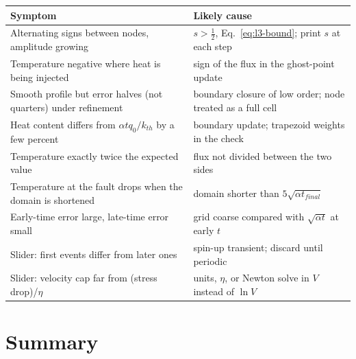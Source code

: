\begin{center}
\small
\renewcommand{\arraystretch}{1.15}
\begin{tabular}{p{}p{}}
\toprule
Symptom & Likely cause \\
\midrule
Alternating signs between nodes, amplitude growing & $s>\tfrac12$, Eq.~\eqref{eq:l3-bound}; print $s$ at each step \\
Temperature negative where heat is being injected & sign of the flux in the ghost-point update \\
Smooth profile but error halves (not quarters) under refinement & boundary closure of low order; node treated as a full cell \\
Heat content differs from $\alpha t q_0/k_{th}$ by a few percent & boundary update; trapezoid weights in the check \\
Temperature exactly twice the expected value & flux not divided between the two sides \\
Temperature at the fault drops when the domain is shortened & domain shorter than $5\sqrt{\alpha t_{final}}$ \\
Early-time error large, late-time error small & grid coarse compared with $\sqrt{\alpha t}$ at early $t$ \\
Slider: first events differ from later ones & spin-up transient; discard until periodic \\
Slider: velocity cap far from (stress drop)/$\eta$ & units, $\eta$, or Newton solve in $V$ instead of $\ln V$ \\
\bottomrule
\end{tabular}
\end{center}

\section{Summary}
\label{sec:l3-summary}

